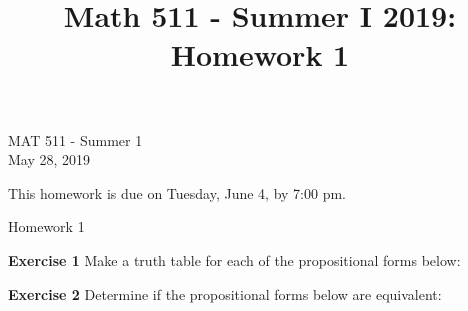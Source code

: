 \documentclass[12pt,oneside]{exam}
\title{Math 511 - Summer I 2019: Homework 1}
\newenvironment{exercise}[1]{\vspace{.1in}\noindent\textbf{Exercise #1 \hspace{.05em}}}{}
\begin{document}
\begin{flushright}
\sc MAT 511 - Summer 1\\
May 28, 2019
\end{flushright}
\bigskip

This homework is due on Tuesday, June 4, by 7:00 pm. 
\begin{center}
\textsf{Homework 1} 
\end{center}


\begin{exercise}{1}
Make a truth table for each of the propositional forms below:
\end{exercise}

\begin{exercise}{2}
Determine if the propositional forms below are equivalent:
\end{exercise}
\end{document}
